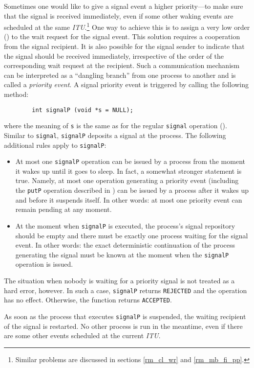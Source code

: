 Sometimes one would like to give a signal event
a higher priority---to make sure that the signal is received immediately,
even if some other waking events are scheduled at the same
{\em ITU}.\footnote{Similar problems are discussed in
sections \ref{rm_cl_wr} and \ref{rm_mb_fi_pp}.}
One way to achieve this is to assign a very low order ()
to the wait request for the signal event.
This solution requires a cooperation from the signal recipient.
It is also possible for the signal sender to indicate that the signal
should be received immediately, irrespective of the order of the
corresponding wait request at the recipient.
Such a communication mechanism can be interpreted as a
``dangling branch'' from one process to another and is called a 
{\em priority event}.
A signal priority event is triggered by calling the following method:
\begin{verbatim}
        int signalP (void *s = NULL);
\end{verbatim}
where the meaning of {\tt s} is the same as for the regular
{\tt signal} operation ().
Similar to {\tt signal}, {\tt signalP} deposits a signal at the process.
The following additional rules apply to {\tt signalP}:
\begin{itemize}
\item
At most one {\tt signalP} operation can be issued by a process from the moment
it wakes up until it goes to sleep.
In fact, a somewhat stronger statement is true.
Namely, at most one operation generating a priority event (including the
{\tt putP} operation described in ) can be issued by a process
after it wakes up and before it suspends itself.
In other words: at most one priority event can remain pending at any moment.
\item
At the moment when {\tt signalP} is executed, the process's signal
repository should be empty and
there must be exactly one process waiting for the signal event.
In other words: the exact deterministic continuation of the process
generating the signal must be known at the moment when the {\tt signalP}
operation is issued.
\end{itemize}

The situation when nobody is waiting for a priority signal is not treated
as a hard error, however.
In such a case, {\tt signalP} returns {\tt REJECTED} and the operation has
no effect.
Otherwise, the function returns {\tt ACCEPTED}.

As soon as the process that executes {\tt signalP} is suspended, the
waiting recipient of the signal is restarted.
No other process is run
in the meantime, even if there are some other events scheduled at
the current {\em ITU}.

